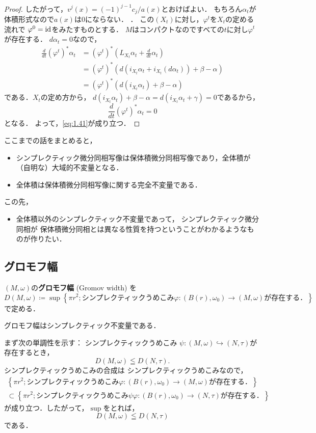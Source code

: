 \begin{proof}
{        したがって，\(v^{j}(x)=(-1)^{j-1}c_{j}/a(x)\)とおけばよい．
        もちろん\(\alpha_t\)が体積形式なので\(a(x)\)は0にならない．
    }．
    この\((X_t)\)に対し，\(\varphi^t\)を\(X_t\)の定める流れで
    \(\varphi^0=\mathop{\mathrm{id}}\nolimits\)をみたすものとする．
    \(M\)はコンパクトなのですべての\(t\)に対し\(\varphi^t\)が存在する．
    \(d\alpha_t=0\)なので，
    \begin{align*}
        \frac{d}{dt}(\varphi^{t})^{\ast}\alpha_t
        &=(\varphi^{t})^{\ast}(L_{X_t}\alpha_t+\frac{d}{dt}\alpha_t)\\
        &=(\varphi^{t})^{\ast}(d(i_{X_t}\alpha_t+i_{X_t}(d\alpha_t))+\beta-\alpha)\\
        &=(\varphi^{t})^{\ast}(d(i_{X_t}\alpha_t)+\beta-\alpha)
    \end{align*}
    である．\(X_t\)の定め方から，
    \(
        d(i_{X_t}\alpha_t)+\beta-\alpha
        =
        d(i_{X_t}\alpha_t+\gamma)=0
    \)であるから，
    \[
        \frac{d}{dt}(\varphi^{t})^{\ast}\alpha_t=0
    \]となる．
    よって，\eqref{eq:1.41}が成り立つ．
\end{proof}

ここまでの話をまとめると，
\begin{itemize}
    \item シンプレクティック微分同相写像は保体積微分同相写像であり，全体積が（自明な）大域的不変量となる．
    \item 全体積は保体積微分同相写像に関する完全不変量である．
\end{itemize}
この先，
\begin{itemize}
    \item 全体積以外のシンプレクティック不変量であって，
    シンプレクティック微分同相が
    保体積微分同相とは異なる性質を持つということがわかるようなものが作りたい．
\end{itemize}
\subsection*{グロモフ幅}
\((M,\omega)\)の\textbf{グロモフ幅} (Gromov width) を
\[
    D(M,\omega)\coloneqq
    \sup\left\{
        \pi r^2;
        \text{シンプレクティックうめこみ\(\varphi\colon(B(r),\omega_{0})\to(M,\omega)\)が存在する．}
    \right\}
\]で定める．
\begin{STT*}
    グロモフ幅はシンプレクティック不変量である．
\end{STT*}
まず次の単調性を示す：
シンプレクティックうめこみ
\(\psi\colon(M,\omega)\hookrightarrow (N,\tau)\)が存在するとき，
\begin{equation}
    D(M,\omega)\leqq D(N,\tau).
\end{equation}
シンプレクティックうめこみの合成は
シンプレクティックうめこみなので，
\begin{align*}
    \left\{
        \pi r^2;
        \text{シンプレクティックうめこみ\(\varphi\colon(B(r),\omega_{0})\to(M,\omega)\)が存在する．}
    \right\}\\
    \subset
    \left\{
        \pi r^2;
        \text{シンプレクティックうめこみ\(\psi\varphi\colon(B(r),\omega_{0})\to(N,\tau)\)が存在する．}
    \right\}
\end{align*}
が成り立つ．したがって，\(\sup\)をとれば，
\[
    D(M,\omega)\leqq D(N,\tau)
\]
である．


